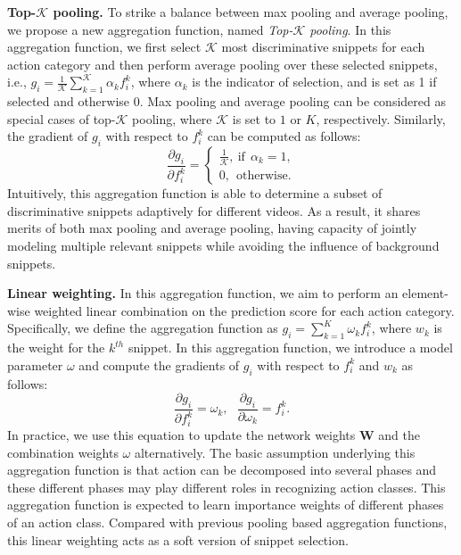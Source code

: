\documentclass[10pt,journal,compsoc]{IEEEtran}
\begin{document}
{\bf Top-$\mathcal{K}$ pooling.} To strike a balance between max pooling and average pooling, we propose a new aggregation function, named {\em Top-$\mathcal{K}$ pooling}. In this aggregation function, we first select $\mathcal{K}$ most discriminative snippets for each action category and then perform average pooling over these selected snippets, i.e., $g_i = \frac{1}{\mathcal{K}} \sum_{k=1}^\mathcal{K} \alpha_k f_i^k$, where $\alpha_k$ is the indicator of selection, and is set as 1 if selected and otherwise 0. Max pooling and average pooling can be considered as special cases of top-$\mathcal{K}$ pooling, where $\mathcal{K}$ is set to $1$ or $K$, respectively. Similarly, the gradient of $g_i$ with respect to $f_i^k$ can be computed as follows:
\begin{equation}
\frac{\partial g_i}{\partial f_i^k} =  \left \{ 
 \begin{array}{l}
 \frac{1}{\mathcal{K}}, \ \textrm{if} \ \ \alpha_k = 1, \\
 0,\ \ \textrm{otherwise.}
 \end{array} 
 \right.
\end{equation}
Intuitively, this aggregation function is able to determine a subset of discriminative snippets adaptively for different videos. As a result, it shares merits of both max pooling and average pooling, having capacity of jointly modeling multiple relevant snippets while avoiding the influence of background snippets.

{\bf Linear weighting.} In this aggregation function, we aim to perform an element-wise weighted linear combination on the prediction score for each action category. Specifically, we define the aggregation function as $g_i = \sum_{k=1}^K \omega_k f_i^k$, where $w_k$ is the weight for the $k^{th}$ snippet. In this aggregation function, we introduce a model parameter $\omega$ and compute the gradients of $g_i$ with respect to $f_i^k$ and $w_k$ as follows:
\begin{equation}
\frac{\partial g_i}{\partial f_i^k} = \omega_k, \ \ \ \frac{\partial g_i}{\partial \omega_k} = f_i^k.
\end{equation}
In practice, we use this equation to update the network weights $\mathbf{W}$ and the combination weights $\omega$ alternatively. The basic assumption underlying this aggregation function is that action can be decomposed into several phases and these different phases may play different roles in recognizing action classes. This aggregation function is expected to learn importance weights of different phases of an action class. Compared with previous pooling based aggregation functions, this linear weighting acts as a soft version of snippet selection. 
\end{document}
